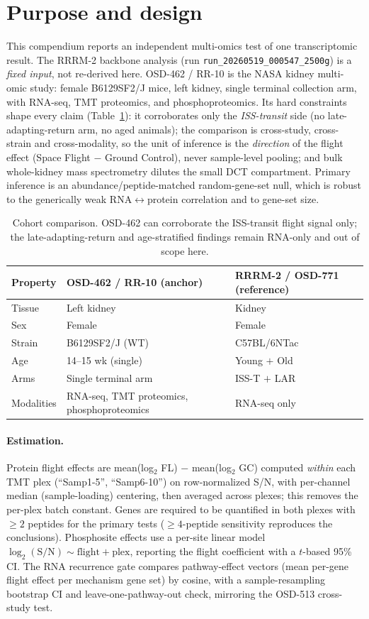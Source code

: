 \documentclass[11pt]{article}
\begin{document}
\section{Purpose and design}
This compendium reports an independent multi-omics test of one transcriptomic result.
The RRRM-2 backbone analysis (run \texttt{run\_20260519\_000547\_2500g}) is a \emph{fixed
input}, not re-derived here. OSD-462 / RR-10 is the NASA kidney multi-omic study: female
B6129SF2/J mice, left kidney, single terminal collection arm, with RNA-seq, TMT
proteomics, and phosphoproteomics. Its hard constraints shape every claim
(Table~\ref{tab:cohort}): it corroborates only the \emph{ISS-transit} side (no
late-adapting-return arm, no aged animals); the comparison is cross-study, cross-strain
and cross-modality, so the unit of inference is the \emph{direction} of the flight
effect (Space Flight $-$ Ground Control), never sample-level pooling; and bulk
whole-kidney mass spectrometry dilutes the small DCT compartment. Primary inference is an
abundance/peptide-matched random-gene-set null, which is robust to the generically weak
RNA$\leftrightarrow$protein correlation and to gene-set size.

\begin{table}[htbp]\centering\small
\begin{tabular}{lll}
\toprule
Property & OSD-462 / RR-10 (anchor) & RRRM-2 / OSD-771 (reference) \\
\midrule
Tissue & Left kidney & Kidney \\
Sex & Female & Female \\
Strain & B6129SF2/J (WT) & C57BL/6NTac \\
Age & 14--15 wk (single) & Young $+$ Old \\
Arms & Single terminal arm & ISS-T $+$ LAR \\
Modalities & RNA-seq, TMT proteomics, phosphoproteomics & RNA-seq only \\
\bottomrule
\end{tabular}
\caption{Cohort comparison. OSD-462 can corroborate the ISS-transit flight signal only;
the late-adapting-return and age-stratified findings remain RNA-only and out of scope here.}
\label{tab:cohort}
\end{table}

\paragraph{Estimation.} Protein flight effects are mean(log$_2$ FL) $-$ mean(log$_2$ GC)
computed \emph{within} each TMT plex (``Samp1-5'', ``Samp6-10'') on row-normalized S/N,
with per-channel median (sample-loading) centering, then averaged across plexes; this
removes the per-plex batch constant. Genes are required to be quantified in both plexes
with $\geq 2$ peptides for the primary tests ($\geq 4$-peptide sensitivity reproduces the
conclusions). Phosphosite effects use a per-site linear model
$\log_2(\text{S/N})\sim\text{flight}+\text{plex}$, reporting the flight coefficient
with a $t$-based 95\% CI. The RNA recurrence gate compares pathway-effect vectors (mean
per-gene flight effect per mechanism gene set) by cosine, with a sample-resampling
bootstrap CI and leave-one-pathway-out check, mirroring the OSD-513 cross-study test.
\end{document}
